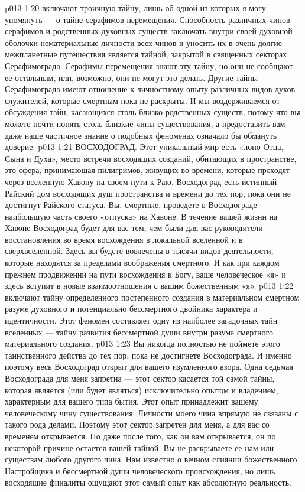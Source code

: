 \vs p013 1:20 \pc {} включают троичную тайну, лишь об одной из которых я могу упомянуть --- о тайне серафимов перемещения. Способность различных чинов серафимов и родственных духовных существ заключать внутри своей духовной оболочки нематериальные личности всех чинов и уносить их в очень долгие межпланетные путешествия является тайной, закрытой в священных секторах Серафимограда. Серафимы перемещения знают эту тайну, но они не сообщают ее остальным, или, возможно, они не могут это делать. Другие тайны Серафимограда имеют отношение к личностному опыту различных видов духов\hyp{}служителей, которые смертным пока не раскрыты. И мы воздерживаемся от обсуждения тайн, касающихся столь близко родственных существ, потому что вы можете почти понять столь близкие чины существования, а предоставить вам даже наше частичное знание о подобных феноменах означало бы обмануть доверие.
\vs p013 1:21 \bibnobreakspace ВОСХОДОГРАД. Этот уникальный мир есть «лоно Отца, Сына и Духа», место встречи восходящих созданий, обитающих в пространстве, это сфера, принимающая пилигримов, живущих во времени, которые проходят через вселенную Хавону на своем пути к Раю. Восходоград есть истинный Райский дом восходящих душ пространства и времени до тех пор, пока они не достигнут Райского статуса. Вы, смертные, проведете в Восходограде наибольшую часть своего «отпуска» на Хавоне. В течение вашей жизни на Хавоне Восходоград будет для вас тем, чем были для вас руководители восстановления во время восхождения в локальной вселенной и в сверхвселенной. Здесь вы будете вовлечены в тысячи видов деятельности, которые находятся за пределами воображения смертного. И как при каждом прежнем продвижении на пути восхождения к Богу, ваше человеческое «я» и здесь вступит в новые взаимоотношения с вашим божественным «я».
\vs p013 1:22 \pc {} включают тайну определенного постепенного создания в материальном смертном разуме духовного и потенциально бессмертного двойника характера и идентичности. Этот феномен составляет одну из наиболее загадочных тайн вселенных --- тайну развития бессмертной души внутри разума смертного материального создания.
\vs p013 1:23 Вы никогда полностью не поймете этого таинственного действа до тех пор, пока не достигнете Восходограда. И именно поэтому весь Восходоград открыт для вашего изумленного взора. Одна седьмая Восходограда для меня запретна --- этот сектор касается той самой тайны, которая является (или будет являться) исключительно опытом и владением, характерным для вашего типа бытия. Этот опыт принадлежит вашему человеческому чину существования. Личности моего чина впрямую не связаны с такого рода делами. Поэтому этот сектор запретен для меня, а для вас со временем открывается. Но даже после того, как он вам открывается, он по некоторой причине остается вашей тайной. Вы не раскрываете ее нам или существам любого другого чина. Нам известно о вечном слиянии божественного Настройщика и бессмертной души человеческого происхождения, но лишь восходящие финалиты ощущают этот самый опыт как абсолютную реальность.

